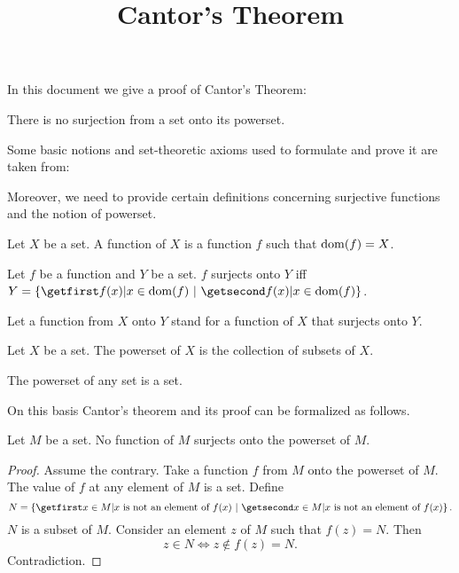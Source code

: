 \documentclass{article}
\title{Cantor's Theorem}
\author{}
\date{}
\begin{document}

  \maketitle

  In this document we give a proof of Cantor's Theorem:

  \begin{theorem*}
    There is no surjection from a set onto its powerset.
  \end{theorem*}

  Some basic notions and set-theoretic axioms used to formulate and prove it are
  taken from:

  \begin{forthel}
  \end{forthel}

  Moreover, we need to provide certain definitions concerning surjective
  functions and the notion of powerset.

  \begin{forthel}
    \begin{definition*}
      Let $X$ be a set.
      A function of $X$ is a function $f$ such that $\operatorname{dom}(f) = X$.
    \end{definition*}

    \begin{definition*}
      Let $f$ be a function and $Y$ be a set.
      $f$ surjects onto $Y$ iff $Y = \class{f(x) | x \in \dom(f)}$.
    \end{definition*}

    Let a function from $X$ onto $Y$ stand for a function of $X$ that surjects onto $Y$.

    \begin{definition*}
      Let $X$ be a set.
      The powerset of $X$ is the collection of subsets of $X$.
    \end{definition*}

    \begin{axiom*}
      The powerset of any set is a set.
    \end{axiom*}
  \end{forthel}

  On this basis Cantor's theorem and its proof can be formalized as follows.

  \begin{forthel}
    \begin{theorem*}[Cantor]
      Let $M$ be a set.
      No function of $M$ surjects onto the powerset of $M$.
    \end{theorem*}
    \begin{proof}
      Assume the contrary.
      Take a function $f$ from $M$ onto the powerset of $M$.
      The value of $f$ at any element of $M$ is a set.
      Define \[ N = \class{x \in M | \text{$x$ is not an element of $f(x)$}}. \]
      $N$ is a subset of $M$.
      Consider an element $z$ of $M$ such that $f(z) = N$.
      Then \[ z \in N \iff z \notin f(z) = N. \]
      Contradiction.
    \end{proof}
  \end{forthel}
\end{document}
